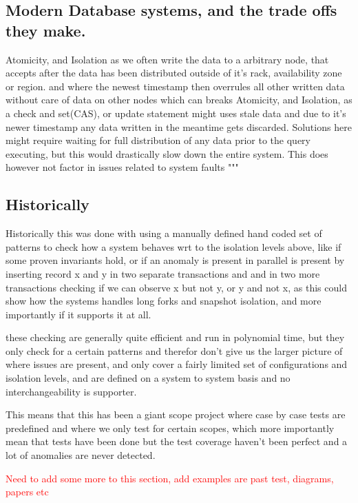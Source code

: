 \documentclass[a4paper,10pt,titlepage]{report}
\begin{document}
\subsection{Modern Database systems, and the trade offs they make.}


Atomicity, and Isolation as we often write the data to a arbitrary node, that accepts after the data has been distributed outside of it's rack, availability zone or region. and where the newest timestamp then overrules all other written data without care of data on other nodes which can breaks Atomicity, and Isolation, as a check and set(CAS), or update statement might uses stale data and due to it's newer timestamp any data written in the meantime gets discarded. Solutions here might require waiting for full distribution of any data prior to the query executing, but this would drastically slow down the entire system. This does however not factor in issues related to system faults
"""

\subsection{Historically}

Historically this was done with using a manually defined hand coded set of patterns to check how a system behaves wrt to the isolation levels above, like if some proven invariants hold, or if an anomaly is present in parallel is present by inserting record x and y in two separate transactions and and in two more transactions checking if we can observe x but not y, or y and not x, as this could show how the systems handles long forks and snapshot isolation, and more importantly if it supports it at all.

these checking are generally quite efficient and run in polynomial time, but they only check for a certain patterns and therefor don't give us the larger picture of where issues are present, and only cover a fairly limited set of configurations and isolation levels, and are defined on a system to system basis and no interchangeability is supporter.

This means that this has been a giant scope project where case by case tests are predefined and where we only test for certain scopes, which more importantly mean that tests have been done but the test coverage haven't been perfect and a lot of anomalies are never detected.

\textcolor{red}{Need to add some more to this section, add examples are past test, diagrams, papers etc}
\end{document}
